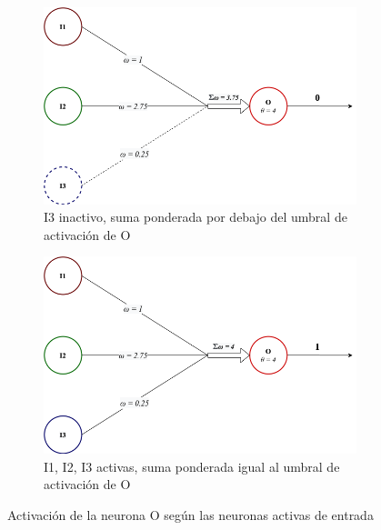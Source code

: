 \begin{figure}[h]
    \centering
    \begin{subfigure}{.45\textwidth}
        \centering
        \includegraphics[scale=0.22]{cap2_contextualizacion/images/red_neuronal_inactive.png}
        \caption{I3 inactivo, suma ponderada por debajo del umbral de activación de O}
        \label{fig:red_neuronal_inactiva}
    \end{subfigure}      
    \begin{subfigure}{.45\textwidth}
        \centering
        \includegraphics[scale=0.22]{cap2_contextualizacion/images/red_neuronal_active.png}
        \caption{I1, I2, I3 activas, suma ponderada igual al umbral de activación de O}
        \label{fig:red_neuronal_activa}
    \end{subfigure}
    \caption{Activación de la neurona O según las neuronas activas de entrada}
    \label{fig:red_neuronal_activacion}
\end{figure}

